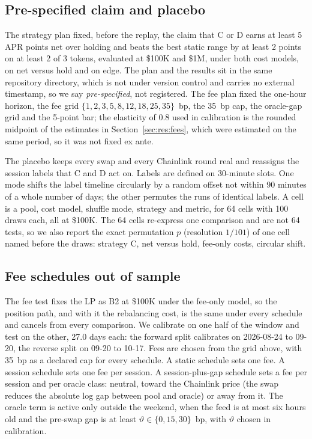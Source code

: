 \documentclass[11pt]{article}
\newcommand{\USD}{\$}
\begin{document}
\subsection{Pre-specified claim and placebo}

The strategy plan fixed, before the replay, the claim that C or D earns at least 5 APR points net over holding and beats the best static range by at least 2 points on at least 2 of 3 tokens, evaluated at \USD100K and \USD1M, under both cost models, on net versus hold and on edge. The plan and the results sit in the same repository directory, which is not under version control and carries no external timestamp, so we say \emph{pre-specified}, not registered. The fee plan fixed the one-hour horizon, the fee grid $\{1,2,3,5,8,12,18,25,35\}$~bp, the 35~bp cap, the oracle-gap grid and the 5-point bar; the elasticity of 0.8 used in calibration is the rounded midpoint of the estimates in Section~\ref{sec:res:fees}, which were estimated on the same period, so it was not fixed ex ante.

The placebo keeps every swap and every Chainlink round real and reassigns the session labels that C and D act on. Labels are defined on 30-minute slots. One mode shifts the label timeline circularly by a random offset not within 90 minutes of a whole number of days; the other permutes the runs of identical labels. A cell is a pool, cost model, shuffle mode, strategy and metric, for 64 cells with 100 draws each, all at \USD100K. The 64 cells re-express one comparison and are not 64 tests, so we also report the exact permutation $p$ (resolution $1/101$) of one cell named before the draws: strategy C, net versus hold, fee-only costs, circular shift.

\subsection{Fee schedules out of sample}

The fee test fixes the LP as B2 at \USD100K under the fee-only model, so the position path, and with it the rebalancing cost, is the same under every schedule and cancels from every comparison. We calibrate on one half of the window and test on the other, 27.0 days each: the forward split calibrates on 2026-08-24 to 09-20, the reverse split on 09-20 to 10-17. Fees are chosen from the grid above, with 35~bp as a declared cap for every schedule. A static schedule sets one fee. A session schedule sets one fee per session. A session-plus-gap schedule sets a fee per session and per oracle class: neutral, toward the Chainlink price (the swap reduces the absolute log gap between pool and oracle) or away from it. The oracle term is active only outside the weekend, when the feed is at most six hours old and the pre-swap gap is at least $\vartheta \in \{0, 15, 30\}$~bp, with $\vartheta$ chosen in calibration.
\end{document}
